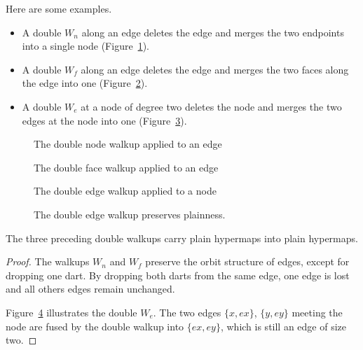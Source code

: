 Here are some examples.
\begin{itemize}
    \item A double $W_n$ along an edge deletes the edge and 
   merges the two endpoints into
    a single node (Figure~\ref{fig:doublenode}). 
    \item A double $W_f$ along an edge 
    deletes the edge and merges the two faces along the edge into
    one (Figure~\ref{fig:doubleface}).
    \item A double $W_e$ at a node of degree two
    deletes the node and merges the two edges at the node into
    one (Figure~\ref{fig:doubleedge}).
\end{itemize}


\begin{figure}[htb]
  \centering
  \caption{The double node walkup applied to an edge}
  \label{fig:doublenode}
\end{figure}


\begin{figure}[htb]
  \centering
  \caption{The double face walkup applied to an edge}
  \label{fig:doubleface}
\end{figure}


\begin{figure}[htb]
  \centering
  \caption{The double edge walkup applied to a node}
  \label{fig:doubleedge}
\end{figure}

\begin{figure}[htb]
  \centering
  \caption{The double edge walkup preserves plainness.}
  \label{fig:doubleplain}
\end{figure}


\begin{lemma}  
The three preceding double walkups carry plain
hypermaps into plain hypermaps.
\end{lemma}

\begin{proof} The walkups $W_n$ and $W_f$ preserve the orbit structure of edges, except for dropping one dart.  By dropping both darts from the same edge, one edge is lost and all others edges remain unchanged.

Figure~\ref{fig:doubleplain} illustrates the double $W_e$.  The two edges $\{x,e x\}$, $\{y, e y\}$ meeting the node are fused by the double walkup into $\{e x, e y\}$, which is still an edge of size two.
\end{proof}

